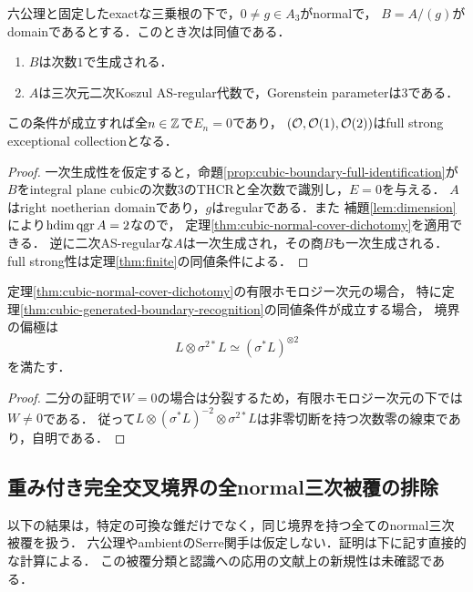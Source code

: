 \documentclass[11pt,a4paper]{ltjsarticle}
\begin{document}
\begin{theorem}[一次生成される整な三次normal境界からの認識]
\label{thm:cubic-generated-boundary-recognition}
六公理と固定したexactな三乗根の下で，$0\ne g\in A_3$がnormalで，
$B=A/(g)$がdomainであるとする．このとき次は同値である．
\begin{enumerate}
\item $B$は次数$1$で生成される．
\item $A$は三次元二次Koszul AS-regular代数で，Gorenstein parameterは$3$である．
\end{enumerate}
この条件が成立すれば全$n\in\mathbb Z$で$E_n=0$であり，
$(\mathcal O,\mathcal O(1),\mathcal O(2))$はfull strong exceptional collectionとなる．
\end{theorem}
\begin{proof}
一次生成性を仮定すると，命題\ref{prop:cubic-boundary-full-identification}が
$B$をintegral plane cubicの次数$3$のTHCRと全次数で識別し，$E=0$を与える．
$A$はright noetherian domainであり，$g$はregularである．また
補題\ref{lem:dimension}により$\operatorname{hdim}\operatorname{qgr} A=2$なので，
定理\ref{thm:cubic-normal-cover-dichotomy}を適用できる．
逆に二次AS-regularな$A$は一次生成され，その商$B$も一次生成される．
full strong性は定理\ref{thm:finite}の同値条件による．
\end{proof}

\begin{corollary}
\label{cor:cubic-regular-triple}
定理\ref{thm:cubic-normal-cover-dichotomy}の有限ホモロジー次元の場合，
特に定理\ref{thm:cubic-generated-boundary-recognition}の同値条件が成立する場合，
境界の偏極は
\[
 L\otimes\sigma^{2*}L\simeq(\sigma^*L)^{\otimes2}
\]
を満たす．
\end{corollary}
\begin{proof}
二分の証明で$W=0$の場合は分裂するため，有限ホモロジー次元の下では$W\ne0$である．
従って$L\otimes(\sigma^*L)^{-2}\otimes\sigma^{2*}L$は非零切断を持つ次数零の線束であり，自明である．
\end{proof}

\subsection{重み付き完全交叉境界の全normal三次被覆の排除}
\label{subsec:v6-weighted-cubic-cover}

以下の結果は，特定の可換な錐だけでなく，同じ境界を持つ全てのnormal三次被覆を扱う．
六公理やambientのSerre関手は仮定しない．証明は下に記す直接的な計算による．
この被覆分類と認識への応用の文献上の新規性は未確認である．
\end{document}
